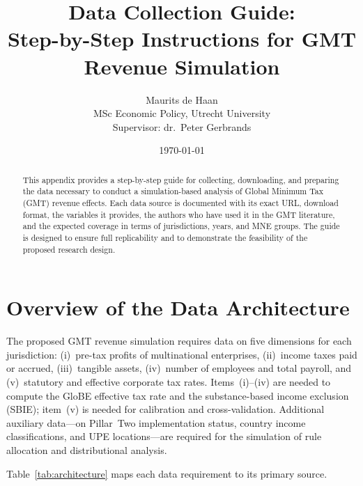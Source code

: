 \documentclass[12pt,a4paper]{article}
\title{%
  \textbf{Data Collection Guide:\\
  Step-by-Step Instructions for GMT Revenue Simulation}%
}
\author{%
  Maurits de Haan\\
  \small MSc Economic Policy, Utrecht University\\
  \small Supervisor: dr.\ Peter Gerbrands%
}
\date{\today}
\begin{document}
\maketitle

\begin{abstract}
This appendix provides a step-by-step guide for collecting, downloading, and preparing the data necessary to conduct a simulation-based analysis of Global Minimum Tax (GMT) revenue effects.
Each data source is documented with its exact URL, download format, the variables it provides, the authors who have used it in the GMT literature, and the expected coverage in terms of jurisdictions, years, and MNE groups.
The guide is designed to ensure full replicability and to demonstrate the feasibility of the proposed research design.
\end{abstract}

\newpage
\tableofcontents
\newpage

\section{Overview of the Data Architecture}\label{sec:overview}

The proposed GMT revenue simulation requires data on five dimensions for each jurisdiction: (i)~pre-tax profits of multinational enterprises, (ii)~income taxes paid or accrued, (iii)~tangible assets, (iv)~number of employees and total payroll, and (v)~statutory and effective corporate tax rates.
Items~(i)--(iv) are needed to compute the GloBE effective tax rate and the substance-based income exclusion (SBIE); item~(v) is needed for calibration and cross-validation.
Additional auxiliary data---on Pillar~Two implementation status, country income classifications, and UPE locations---are required for the simulation of rule allocation and distributional analysis.

Table~\ref{tab:architecture} maps each data requirement to its primary source.
\end{document}
